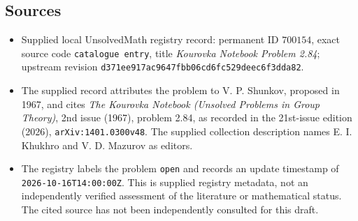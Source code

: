 \documentclass[11pt]{article}
\begin{document}
\subsection{Sources}
\begin{itemize}
\item Supplied local UnsolvedMath registry record: permanent ID \(700154\), exact source code \texttt{catalogue entry}, title \emph{Kourovka Notebook Problem 2.84}; upstream revision \texttt{d371ee917ac9647fbb06cd6fc529deec6f3dda82}.
\item The supplied record attributes the problem to V. P. Shunkov, proposed in 1967, and cites \emph{The Kourovka Notebook (Unsolved Problems in Group Theory)}, 2nd issue (1967), problem 2.84, as recorded in the 21st-issue edition (2026), \texttt{arXiv:1401.0300v48}. The supplied collection description names E. I. Khukhro and V. D. Mazurov as editors.
\item The registry labels the problem \texttt{open} and records an update timestamp of \texttt{2026-10-16T14:00:00Z}. This is supplied registry metadata, not an independently verified assessment of the literature or mathematical status. The cited source has not been independently consulted for this draft.
\end{itemize}
\end{document}
